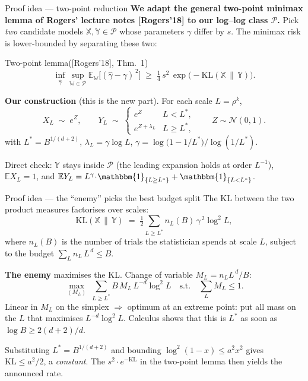 \documentclass[10pt, aspectratio=169, xcolor={table}]{beamer}
\newcommand{\E}{\mathbb{E}}
\begin{document}
\begin{frame}{Proof idea --- two-point reduction}
  \textbf{We adapt the general two-point minimax lemma of Rogers'
  lecture notes [Rogers'18] to our log--log class
  $\mathcal{P}$.} Pick \emph{two} candidate models
  $\mathbb{X},\mathbb{Y}\in\mathcal{P}$ whose parameters $\gamma$
  differ by $s$. The minimax risk is lower-bounded by separating
  these two:
  \begin{block}{Two-point lemma\hfill\normalfont\footnotesize([Rogers'18], Thm.~1)}
    \[
      \inf_{\hat\gamma}\sup_{\mathbb{W}\in\mathcal{P}}
        \E_{\mathbb{W}}\bigl[(\hat\gamma - \gamma)^{\,2}\bigr]
      \;\ge\; \tfrac{1}{4}\,s^{2}\,\exp\bigl(-\mathrm{KL}(\mathbb{X}\,\|\,\mathbb{Y})\bigr).
    \]
  \end{block}

  \vspace{0.4em}
  \textbf{Our construction} (this is the new part). For each scale
  $L=\rho^{k}$,
  \[
    X_L \;\sim\; e^{Z},\qquad
    Y_L \;\sim\;
      \begin{cases} e^{Z} & L < L^{\ast},\\[0.2em]
                    e^{Z + \lambda_L} & L \ge L^{\ast}, \end{cases}
        \qquad Z\sim\mathcal{N}(0,1).
  \]
  \quad with $L^{\ast}=B^{1/(d+2)}$,
  $\lambda_L = \gamma \log L$,
  $\gamma = \log\!\bigl(1-1/L^{\ast}\bigr)\big/\log(1/L^{\ast})$.

  \vspace{0.4em}
  Direct check: $\mathbb{Y}$ stays inside $\mathcal{P}$ (the leading
  expansion holds at order $L^{-1}$), $\E X_L = 1$, and
  $\E Y_L = L^{\gamma}\!\cdot\!\mathbbm{1}_{\{L\ge L^{\ast}\}}+\mathbbm{1}_{\{L<L^{\ast}\}}$.
\end{frame}

\begin{frame}{Proof idea --- the ``enemy'' picks the best budget split}
  The KL between the two product measures factorises over scales:
  \[
    \mathrm{KL}(\mathbb{X}\,\|\,\mathbb{Y})
      \;=\; \tfrac{1}{2}\sum_{L\ge L^{\ast}} n_L(B)\,\gamma^{\,2}\log^{2}\!L,
  \]
  where $n_L(B)$ is the number of trials the statistician spends at
  scale $L$, subject to the budget $\sum_L n_L\,L^{\,d}\le B$.

  \vspace{0.4em}
  \textbf{The enemy} maximises the KL. Change of variable
  $M_L = n_L L^{\,d}/B$:
  \[
    \max_{(M_L)}\;\sum_{L\ge L^{\ast}} B\,M_L\,L^{-d}\log^{2}\!L
        \quad\text{s.t.}\quad \sum_L M_L \le 1.
  \]
  Linear in $M_L$ on the simplex $\Rightarrow$ optimum at an extreme point:
  put all mass on the $L$ that maximises $L^{-d}\log^{2}\!L$. Calculus shows that
  this is $L^{\ast}$ as soon as $\log B\ge 2(d+2)/d$.

  \vspace{0.4em}
  Substituting $L^{\ast}=B^{1/(d+2)}$ and bounding
  $\log^{2}(1-x)\le a^{2}x^{2}$ gives $\mathrm{KL}\le a^{2}/2$, a
  \emph{constant}. The $s^{2}\!\cdot\! e^{-\mathrm{KL}}$ in the two-point
  lemma then yields the announced rate.
\end{frame}
\end{document}

